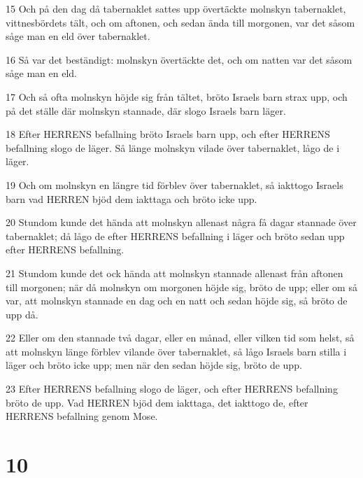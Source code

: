 \par 15 Och på den dag då tabernaklet sattes upp övertäckte molnskyn tabernaklet, vittnesbördets tält, och om aftonen, och sedan ända till morgonen, var det såsom såge man en eld över tabernaklet.
\par 16 Så var det beständigt: molnskyn övertäckte det, och om natten var det såsom såge man en eld.
\par 17 Och så ofta molnskyn höjde sig från tältet, bröto Israels barn strax upp, och på det ställe där molnskyn stannade, där slogo Israels barn läger.
\par 18 Efter HERRENS befallning bröto Israels barn upp, och efter HERRENS befallning slogo de läger. Så länge molnskyn vilade över tabernaklet, lågo de i läger.
\par 19 Och om molnskyn en längre tid förblev över tabernaklet, så iakttogo Israels barn vad HERREN bjöd dem iakttaga och bröto icke upp.
\par 20 Stundom kunde det hända att molnskyn allenast några få dagar stannade över tabernaklet; då lågo de efter HERRENS befallning i läger och bröto sedan upp efter HERRENS befallning.
\par 21 Stundom kunde det ock hända att molnskyn stannade allenast från aftonen till morgonen; när då molnskyn om morgonen höjde sig, bröto de upp; eller om så var, att molnskyn stannade en dag och en natt och sedan höjde sig, så bröto de upp då.
\par 22 Eller om den stannade två dagar, eller en månad, eller vilken tid som helst, så att molnskyn länge förblev vilande över tabernaklet, så lågo Israels barn stilla i läger och bröto icke upp; men när den sedan höjde sig, bröto de upp.
\par 23 Efter HERRENS befallning slogo de läger, och efter HERRENS befallning bröto de upp. Vad HERREN bjöd dem iakttaga, det iakttogo de, efter HERRENS befallning genom Mose.

\chapter{10}

